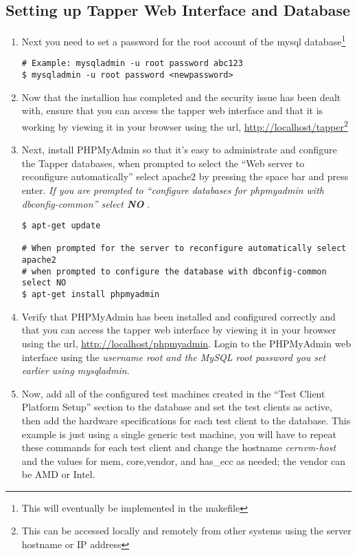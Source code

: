\subsection{Setting up Tapper Web Interface and Database}
\begin{enumerate}
\item 	Next you need to set a password for the root account of the mysql database\footnote{This will eventually be implemented in the 
		makefile}

\lstset{language=bash,caption= Set MySQL Root Password}
\begin{lstlisting}
# Example: mysqladmin -u root password abc123
$ mysqladmin -u root password <newpassword>
\end{lstlisting}

\item 	Now that the installion has completed and the security issue has been dealt with, ensure that you can access the tapper web
		interface and that it is working by viewing it in your browser using the url, \url{http://localhost/tapper}\footnote{This can be accessed
		locally and remotely from other systems using the server hostname or IP address}

\item 	Next, install PHPMyAdmin so that it's easy to administrate and configure the Tapper databases, when prompted to select the
		``Web server to reconfigure automatically'' select apache2 by pressing the space bar and press enter. \emph{If you are 
		prompted to ``configure databases for phpmyadmin with dbconfig-common'' select {\bf NO} }.

\lstset{language=bash,caption= Install PHPMyAdmin}
\begin{lstlisting}
$ apt-get update

# When prompted for the server to reconfigure automatically select apache2
# when prompted to configure the database with dbconfig-common select NO
$ apt-get install phpmyadmin
\end{lstlisting}

\item	Verify that PHPMyAdmin has been installed and configured correctly and that you can access the tapper web
		interface by viewing it in your browser using the url, \url{http://localhost/phpmyadmin}. Login to the PHPMyAdmin
		web interface using the \emph{username root and the MySQL root password you set earlier using mysqladmin}.

\item 	Now, add all of the configured test machines created in the ``Test Client Platform Setup'' section to the
		\tapper database and set the test clients as active, then add the hardware specifications for each test client
		to the database. This example is just using a single generic test machine, you will have to repeat these commands
		for each test client and change the hostname \emph{cernvm-host} and the values for mem, core,vendor, and has\_ecc 
		as needed; the vendor can be AMD or Intel.
		

\end{enumerate}
